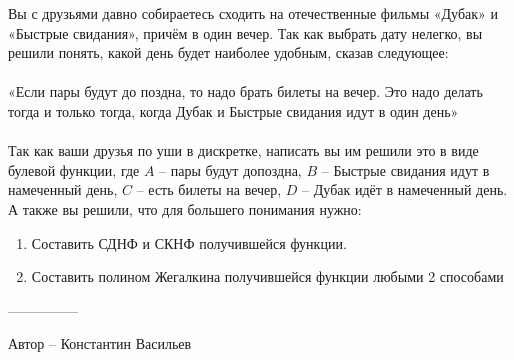 \question
Вы с друзьями давно собираетесь сходить на отечественные фильмы «Дубак» и «Быстрые свидания», причём в один вечер. Так как выбрать дату нелегко, вы решили понять, какой день будет наиболее удобным, сказав следующее:
\\
\\
«Если пары будут до поздна, то надо брать билеты на вечер. Это надо делать тогда и только тогда, когда Дубак и Быстрые свидания идут в один день»
\\
\\
Так как ваши друзья по уши в дискретке, написать вы им решили это в виде булевой функции, где $A$ – пары будут допоздна, $B$ – Быстрые свидания идут в намеченный день, $C$ – есть билеты на вечер, $D$ – Дубак идёт в намеченный день. А также вы решили, что для большего понимания нужно:
\begin{enumerate}
    \item Составить СДНФ и СКНФ получившейся функции.
    \item Составить полином Жегалкина получившейся функции любыми 2 способами
\end{enumerate}

---------------

Автор -- Константин Васильев